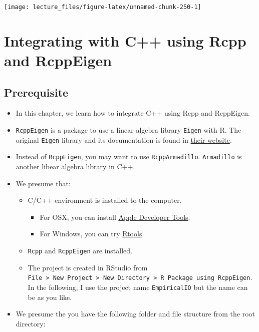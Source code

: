 \documentclass[
]{book}
\providecommand{\tightlist}{%
  \setlength{\itemsep}{0pt}\setlength{\parskip}{0pt}}
\begin{document}
\begin{center}\texttt{[image: lecture\_files/figure-latex/unnamed-chunk-250-1]} \end{center}

\hypertarget{rcpp}{%
\chapter{Integrating with C++ using Rcpp and RcppEigen}\label{rcpp}}

\hypertarget{prerequisite}{%
\section{Prerequisite}\label{prerequisite}}

\begin{itemize}
\tightlist
\item
  In this chapter, we learn how to integrate C++ using Rcpp and RcppEigen.
\item
  \texttt{RcppEigen} is a package to use a linear algebra library \texttt{Eigen} with R. The original \texttt{Eigen} library and its documentation is found in \href{http://eigen.tuxfamily.org/index.php?title=Main_Page}{their website}.
\item
  Instead of \texttt{RcppEigen}, you may want to use \texttt{RcppArmadillo}. \texttt{Armadillo} is another libear algebra library in C++.
\item
  We presume that:

  \begin{itemize}
  \tightlist
  \item
    C/C++ environment is installed to the computer.

    \begin{itemize}
    \tightlist
    \item
      For OSX, you can install \href{https://developer.apple.com/xcode/}{Apple Developer Tools}.
    \item
      For Windows, you can try \href{https://cran.r-project.org/bin/windows/Rtools/}{Rtools}.
    \end{itemize}
  \item
    \texttt{Rcpp} and \texttt{RcppEigen} are installed.
  \item
    The project is created in RStudio from \texttt{File\ \textgreater{}\ New\ Project\ \textgreater{}\ New\ Directory\ \textgreater{}\ R\ Package\ using\ RcppEigen}. In the following, I use the project name \texttt{EmpiricalIO} but the name can be as you like.
  \end{itemize}
\item
  We presume the you have the following folder and file structure from the root directory:


\end{itemize}
\end{document}
